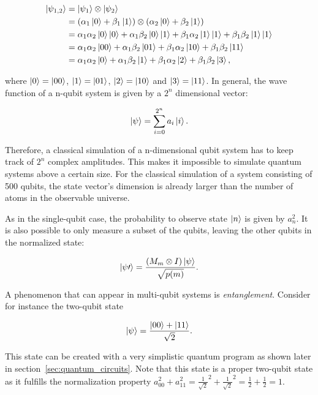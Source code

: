 \begin{align}
  \Ket{\psi_{1,2}} &= \Ket{\psi_1} \otimes \Ket{\psi_2} \\
                   &= (\alpha_1 \Ket{0} + \beta_1 \Ket{1}) \otimes (\alpha_2 \Ket{0} + \beta_2 \Ket{1}) \\
                   &= \alpha_1 \alpha_2 \Ket{0}\Ket{0} + \alpha_1 \beta_2 \Ket{0} \Ket{1} + \beta_1 \alpha_2 \Ket{1} \Ket{1} + \beta_1 \beta_2 \Ket{1} \Ket{1} \\
                   &= \alpha_1 \alpha_2 \Ket{00} + \alpha_1 \beta_2 \Ket{01} + \beta_1 \alpha_2 \Ket{10} + \beta_1 \beta_2 \Ket{11} \\
                   &= \alpha_1 \alpha_2 \Ket{0} + \alpha_1 \beta_2 \Ket{1} + \beta_1 \alpha_2 \Ket{2} + \beta_1 \beta_2 \Ket{3},
\end{align}

where $\Ket{0} = \Ket{00}$, $\Ket{1} = \Ket{01}$, $\Ket{2} = \Ket{10}$
and $\Ket{3} = \Ket{11}$. In general, the wave function of a
n-qubit system is given by a $2^n$ dimensional vector:

\begin{equation}
  \Ket{\psi} = \sum_{i=0}^{2^n}a_i \Ket{i}.
\end{equation}

Therefore, a classical simulation of a n-dimensional qubit system has to keep
track of $2^n$ complex amplitudes. This makes it impossible to simulate quantum
systems above a certain size. For the classical simulation of a system
consisting of 500 qubits, the state vector's dimension is already larger
than the number of atoms in the observable universe.  

As in the single-qubit case, the probability to observe state $\Ket{n}$ is
given by $a_n^2$. It is also possible to only measure a subset of the qubits,
leaving the other qubits in the normalized state:

\begin{equation}
  \Ket{\psi\prime} = \frac{(M_m \otimes I) \Ket{\psi}}{\sqrt{p(m)}}.
\end{equation}

A phenomenon that can appear in multi-qubit systems is
\textit{entanglement}. Consider for instance the two-qubit state

\begin{equation}
  \Ket{\psi} = \frac{\Ket{00} + \Ket{11}}{\sqrt{2}}.
\end{equation}

This state can be created with a very simplistic quantum program as shown later in
section~\ref{sec:quantum_circuits}.
Note that this state is a proper two-qubit state as it fulfills the
normalization property
$a_{00}^2 + a_{11}^2 = \frac{1}{\sqrt{2}}^2 + \frac{1}{\sqrt{2}}^2 = \frac{1}{2}
+ \frac{1}{2} = 1$.

